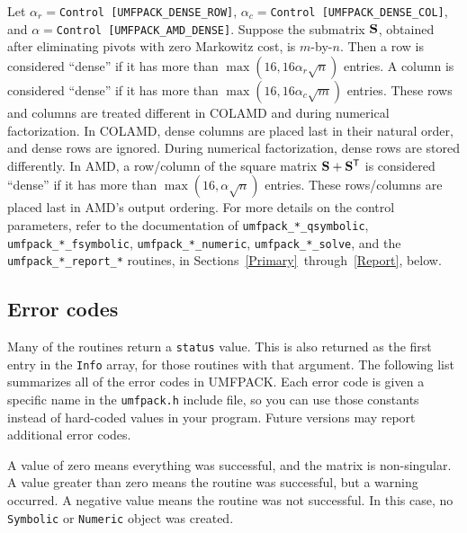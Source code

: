 \documentclass[11pt]{article}
\newcommand{\m}[1]{{\bf{#1}}}       %
\newcommand{\tr}{^{\sf T}}          %
\begin{document}
Let $\alpha_r = ${\tt Control [UMFPACK\_DENSE\_ROW]},
    $\alpha_c = ${\tt Control [UMFPACK\_DENSE\_COL]}, and
    $\alpha = ${\tt Control [UMFPACK\_AMD\_DENSE]}.
Suppose the submatrix $\m{S}$, obtained after eliminating pivots with
zero Markowitz cost, is $m$-by-$n$.
Then a row is considered ``dense'' if it has more than
$\max (16, 16 \alpha_r \sqrt{n})$ entries.
A column is considered ``dense'' if it has more than
$\max (16, 16 \alpha_c \sqrt{m})$ entries.
These rows and columns are treated different in COLAMD and during numerical
factorization.   In COLAMD, dense columns are placed last in their natural
order, and dense rows are ignored.  During numerical factorization, dense
rows are stored differently.
In AMD, a row/column of the square matrix $\m{S}+\m{S}\tr$ is
considered ``dense'' if it has more than $\max (16, \alpha \sqrt{n})$ entries.
These rows/columns are placed last in AMD's output ordering.
For more details on the control parameters, refer to the documentation of
{\tt umfpack\_*\_qsymbolic},
{\tt umfpack\_*\_fsymbolic},
{\tt umfpack\_*\_numeric}, {\tt umfpack\_*\_solve},
and the {\tt umfpack\_*\_report\_*} routines,
in Sections~\ref{Primary}~through~\ref{Report}, below.

\subsection{Error codes}
\label{error_codes}

Many of the routines return a {\tt status} value.
This is also returned as the first entry in the {\tt Info} array, for
those routines with that argument.  The following list summarizes
all of the error codes in UMFPACK.  Each error code is given a
specific name in the {\tt umfpack.h} include file, so you can use
those constants instead of hard-coded values in your program.
Future versions may report additional error codes.

A value of zero means everything was successful, and the matrix is
non-singular.  A value greater than zero means the routine was successful,
but a warning occurred.
A negative value means the routine was not successful.
In this case, no {\tt Symbolic} or {\tt Numeric} object was created.
\end{document}
